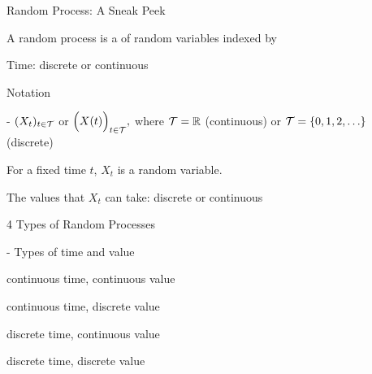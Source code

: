 \documentclass[fleqn,aspectratio=169]{beamer}
\begin{document}
\begin{frame}{Random Process: A Sneak Peek}

\plitemsep 0.1in
\bci 

\item<2-> A random process is a  of random variables indexed by 

\item<3-> Time: discrete or continuous

\item<4-> Notation

- $(X_t)_{t \in \mathcal T}$ or $\Bigl(X(t)\Bigl)_{t \in \mathcal T},$ where $\mathcal T = {\mathbb R}$ (continuous) or $\mathcal T = \{ 0, 1, 2, \ldots \}$ (discrete)



\item<7-> For a fixed time $t$, $X_t$ is a random variable.

\item<8-> The values that $X_t$ can take: discrete or continuous

\eci

\end{frame}

\begin{frame}{4 Types of Random Processes}

- Types of time and value

\bigskip
{}
{
\bigskip
\small
\plitemsep 0.1in
\bce[(a)] 
\item continuous time, continuous value
\item continuous time, discrete value
\item discrete time, continuous value
\item discrete time, discrete value
\ece

}
{
\centering
{}

}

\end{frame}
\end{document}
